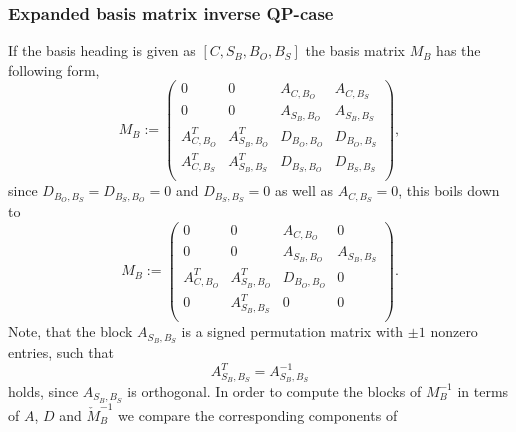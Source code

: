 \documentclass[a4paper]{article}
\begin{document}
\subsubsection{Expanded basis matrix inverse QP-case}
If the basis heading is given as $\left[C, S_{B}, B_{O}, B_{S} \right]$ the
basis matrix $M_{B}$ has the following form,
\begin{equation*}
\label{def:basis_matrix_form}
M_{B}:=
\left(\begin{array}{c|c|c|c}
        0 & 0 & A_{C, B_{O}} & A_{C, B_{S}} \\
        \hline
	0 & 0 & A_{S_{B}, B_{O}} & A_{S_{B}, B_{S}} \\
	\hline
        A_{C, B_{O}}^{T} & A_{S_{B}, B_{O}}^{T} & D_{B_{O}, B_{O}}
	  & D_{B_{O}, B_{S}} \\
        \hline
        A_{C, B_{S}}^{T} & A_{S_{B}, B_{S}}^{T} & D_{B_{S}, B_{O}}
	  & D_{B_{S}, B_{S}} \\
      \end{array}
\right),
\end{equation*}
since $D_{B_{O}, B_{S}} = D_{B_{S}, B_{O}} = 0$ and
$D_{B_{S}, B_{S}} = 0$ as well as $A_{C, B_{S}}=0$, this boils down to
\begin{equation}
\label{def:basis_matrix}
M_{B}:=
\left(\begin{array}{c|c|c|c}
        0 & 0 & A_{C, B_{O}} & 0 \\
        \hline
	0 & 0 & A_{S_{B}, B_{O}} & A_{S_{B}, B_{S}} \\
	\hline
        A_{C, B_{O}}^{T} & A_{S_{B}, B_{O}}^{T} & D_{B_{O}, B_{O}}
	  & 0 \\
        \hline
        0 & A_{S_{B}, B_{S}}^{T} & 0
	  & 0 \\
      \end{array}
\right).
\end{equation}
Note, that the block $A_{S_{B}, B_{S}}$ is a signed permutation matrix with
$\pm 1$ nonzero entries, such that
\begin{equation}
\label{eq:A_S_BxB_S_inv}
A_{S_{B}, B_{S}}^{T} = A_{S_{B}, B_{S}}^{-1}
\end{equation}
holds, since $A_{S_{B}, B_{S}}$ is orthogonal.
In order to compute the blocks of $M_{B}^{-1}$ in terms of $A$, $D$ and
$\check{M}_{B}^{-1}$ we compare the corresponding
components of
\end{document}
